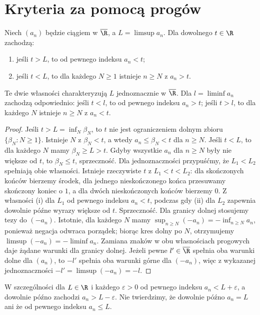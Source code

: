 \section{Kryteria za pomocą progów}
\begin{twierdzenie}
\label{ma1:thm:limsup-thresholds}
Niech $(a_n)$ będzie ciągiem w $\overline{\R}$, a $L=\limsup a_n$. Dla dowolnego $t\in\R$ zachodzą:
\begin{enumerate}[label=(\roman*)]
\item jeśli $t>L$, to od pewnego indeksu $a_n<t$;
\item jeśli $t<L$, to dla każdego $N\ge1$ istnieje $n\ge N$ z $a_n>t$.
\end{enumerate}
Te dwie własności charakteryzują $L$ jednoznacznie w $\overline{\R}$. Dla $l=\liminf a_n$ zachodzą odpowiednio: jeśli $t<l$, to od pewnego indeksu $a_n>t$; jeśli $t>l$, to dla każdego $N$ istnieje $n\ge N$ z $a_n<t$.
\end{twierdzenie}
\begin{proof}
Jeśli $t>L=\inf_N\beta_N$, to $t$ nie jest ograniczeniem dolnym zbioru $\{\beta_N:N\ge1\}$. Istnieje $N$ z $\beta_N<t$, a wtedy $a_n\le\beta_N<t$ dla $n\ge N$.
Jeśli $t<L$, to dla każdego $N$ mamy $\beta_N\ge L>t$. Gdyby wszystkie $a_n$ dla $n\ge N$ były nie większe od $t$, to $\beta_N\le t$, sprzeczność.
Dla jednoznaczności przypuśćmy, że $L_1<L_2$ spełniają obie własności. Istnieje rzeczywiste $t$ z $L_1<t<L_2$: dla skończonych końców bierzemy środek, dla jednego nieskończonego końca przesuwamy skończony koniec o $1$, a dla dwóch nieskończonych końców bierzemy $0$. Z własności (i) dla $L_1$ od pewnego indeksu $a_n<t$, podczas gdy (ii) dla $L_2$ zapewnia dowolnie późne wyrazy większe od $t$. Sprzeczność. Dla granicy dolnej stosujemy tezy do $(-a_n)$. Istotnie, dla każdego $N$ mamy $\sup_{n\ge N}(-a_n)=-\inf_{n\ge N}a_n$, ponieważ negacja odwraca porządek; biorąc kres dolny po $N$, otrzymujemy $\limsup(-a_n)=-\liminf a_n$. Zamiana znaków w obu własnościach progowych daje żądane warunki dla granicy dolnej. Jeżeli pewne $l'\in\overline{\R}$ spełnia oba warunki dolne dla $(a_n)$, to $-l'$ spełnia oba warunki górne dla $(-a_n)$, więc z wykazanej jednoznaczności $-l'=\limsup(-a_n)=-l$.
\end{proof}
W szczególności dla $L\in\R$ i każdego $\varepsilon>0$ od pewnego indeksu $a_n<L+\varepsilon$, a dowolnie późno zachodzi $a_n>L-\varepsilon$. Nie twierdzimy, że dowolnie późno $a_n=L$ ani że od pewnego indeksu $a_n\le L$.

